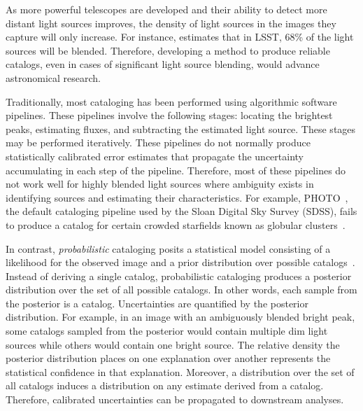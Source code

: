As more powerful telescopes are developed and their ability to detect more distant light sources improves, the density of light sources in the images they capture will only increase. 
For instance, \cite{Bosch_2017_LSST} estimates that in LSST, 68\% of the light sources will be blended. Therefore, developing a method to produce reliable catalogs, even in cases of significant light source blending, would advance astronomical research. 


\bigbreak


Traditionally, most cataloging has been performed using algorithmic software pipelines.
These pipelines involve the following stages: locating the brightest peaks, estimating fluxes, and subtracting the estimated light source.
These stages may be performed iteratively.
These pipelines do not normally produce statistically calibrated error estimates that propagate 
the uncertainty accumulating in each step of the pipeline. 
Therefore, most of these pipelines do not work well for highly blended light sources where ambiguity exists in identifying sources and estimating their characteristics.
For example, PHOTO~\cite{lupton2001sdss}, the default cataloging pipeline used by the Sloan Digital Sky Survey (SDSS), fails to 
produce a catalog for certain crowded starfields known as globular clusters~\cite{Portillo_2017}. 

In contrast, {\itshape probabilistic} cataloging posits a statistical model consisting of a likelihood for the observed image and a prior distribution over possible catalogs~\cite{Portillo_2017, Brewer_2013, Feder_2019}. 
Instead of deriving a single catalog, probabilistic cataloging produces a posterior distribution over the set of all possible catalogs. 
In other words, each sample from the posterior is a catalog. 
Uncertainties are quantified by the posterior distribution. 
For example, in an image with an ambiguously blended bright peak, some catalogs sampled from the posterior would contain multiple dim light sources while others would contain one bright source. 
The relative density the posterior distribution places on one explanation over another represents the statistical confidence in that explanation. 
Moreover, a distribution over the set of all catalogs induces a distribution on any estimate derived from a catalog. Therefore, calibrated uncertainties can be propagated to downstream analyses.  

